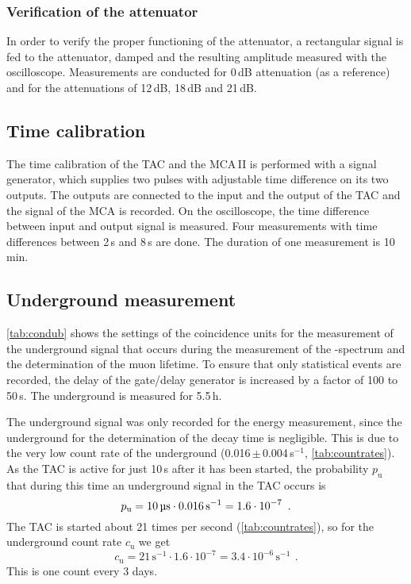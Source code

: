 \subsubsection{Verification of the attenuator}
In order to verify the proper functioning of the attenuator,
a rectangular signal is fed to the attenuator, damped and the resulting amplitude measured with the oscilloscope.
Measurements are conducted for 0\,dB attenuation (as a reference) and
for the attenuations of 12\,dB, 18\,dB and 21\,dB.


\subsection{Time calibration}
The time calibration of the TAC and the MCA\,II is performed
with a signal generator,
which supplies two pulses with adjustable time difference on its two outputs.
The outputs are connected to the input and the output of the TAC and the signal
of the MCA is recorded.
On the oscilloscope, the time difference between input and output signal is measured.
Four measurements with time differences between 2\,\textmu s and 8\,\textmu s are done.
The duration of one measurement is 10\,min.


\subsection{Underground measurement}
\autoref{tab:condub} shows the settings of the coincidence units for the measurement of the underground
signal that occurs during the measurement of the \textbeta-spectrum and the determination of the muon lifetime.
To ensure that only statistical events are recorded, the delay of the gate/delay generator is increased by 
a factor of 100 to 50\,\textmu s. The underground is measured for 5.5\,h.

The underground signal was only recorded for the energy measurement,
since the underground for the determination of the decay time is negligible.
This is due to the very low count rate of the underground (0.016\,$\pm$\,0.004\,s$^{-1}$, \autoref{tab:countrates}).
As the TAC is active for just 10\,\textmu s after it has been started, the probability $p_\text{u}$
that during this time an underground signal in the TAC occurs is
\begin{equation}
    p_\text{u}=10\,\text{\textmu s} \cdot 0.016\,\text{s}^{-1}=1.6 \cdot 10^{-7} \ \, .
\end{equation}
The TAC is started about 21 times per second (\autoref{tab:countrates}),
so for the underground count rate $c_\text{u}$ we get
\begin{equation}
    c_\text{u}=21\,\text{s}^{-1}\cdot1.6\cdot10^{-7}=3.4\cdot10^{-6}\,\text{s}^{-1} \ \, .
\end{equation}
This is one count every 3 days.

